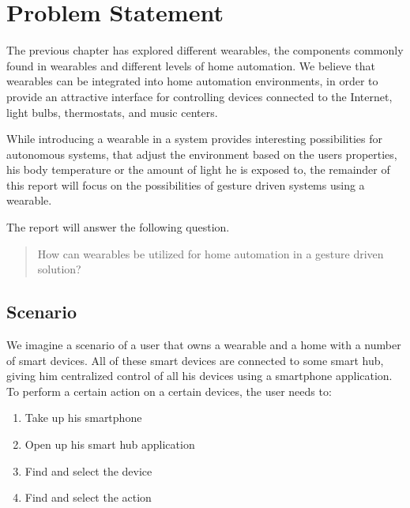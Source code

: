 \section{Problem Statement}\label{sec:researchstatement}

The previous chapter has explored different wearables, 
the components commonly found in wearables and different levels of home automation. 
We believe that wearables can be integrated into home automation environments, 
in order to provide an attractive interface for controlling devices connected to the Internet, 
\eg light bulbs, thermostats, and music centers.

While introducing a wearable in a system provides interesting possibilities for autonomous systems, 
that adjust the environment based on the users properties, 
\eg his body temperature or the amount of light he is exposed to, 
the remainder of this report will focus on the possibilities of gesture driven systems using a wearable.

The report will answer the following question.

\begin{framed}
    \begin{quote}
      How can wearables be utilized for home automation in a gesture driven solution?
    \end{quote}
\end{framed}

\subsection{Scenario}
We imagine a scenario of a user that owns a wearable and a home with a number of smart devices. 
All of these smart devices are connected to some smart hub, 
giving him centralized control of all his devices using \eg a smartphone application.
To perform a certain action on a certain devices, the user needs to:
\begin{enumerate}
  \item Take up his smartphone
  \item Open up his smart hub application
  \item Find and select the device
  \item Find and select the action
\end{enumerate}

